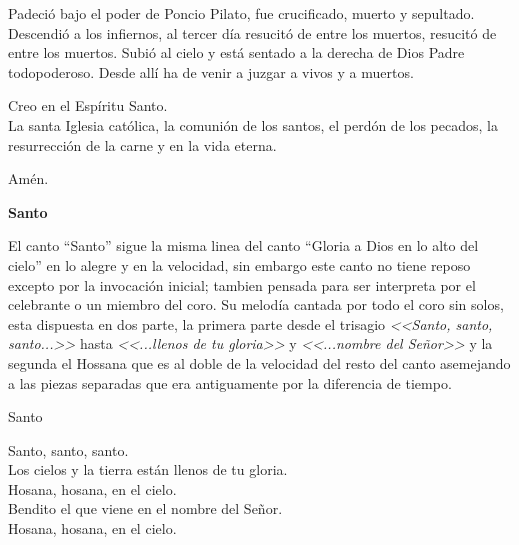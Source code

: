 \documentclass[12pt, letterpaper]{report}
\begin{document}
    \noindent
    Padeci\'o bajo el poder de Poncio Pilato, fue crucificado, muerto y sepultado. Descendi\'o a los infiernos, al tercer d\'ia resucit\'o de entre los muertos, resucit\'o de entre los muertos. Subi\'o al cielo y est\'a sentado a la derecha de Dios Padre todopoderoso. Desde all\'i ha de venir a juzgar a vivos y a muertos.

    \noindent
    Creo en el Esp\'iritu Santo.\\
    La santa Iglesia cat\'olica, la comuni\'on de los santos, el perd\'on de los pecados, la resurrecci\'on de la carne y en la vida eterna.

    \noindent
    Am\'en.
    \clearpage




    \begin{center}
      \LARGE \textbf{Santo}
    \end{center}

    \Large El canto ``Santo'' sigue la misma linea del canto ``Gloria a Dios en lo alto del cielo'' en lo alegre y en la velocidad, sin embargo este canto no tiene reposo excepto por la invocaci\'on inicial; tambien pensada para ser interpreta por el celebrante o un miembro del coro. Su melod\'ia cantada por todo el coro sin solos, esta dispuesta en dos parte, la primera parte desde el trisagio \textit{<<Santo, santo, santo...>>} hasta \textit{<<...llenos de tu gloria>>} y \textit{<<...nombre del Se\~nor>>} y la segunda el Hossana que es al doble de la velocidad del resto del canto asemejando a las piezas separadas que era antiguamente por la diferencia de tiempo.
    
    \noindent
    \LARGE Santo
    
    \noindent
    \LARGE Santo, santo, santo. \\
    Los cielos y la tierra est\'an llenos de tu gloria.\\
    Hosana, hosana, en el cielo.\\
    Bendito el que viene en el nombre del Se\~nor. \\
    Hosana, hosana, en el cielo.
    \clearpage
\end{document}
